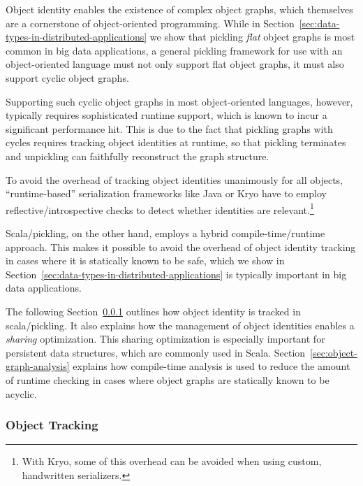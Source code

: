 \documentclass[preprint,10pt]{sigplanconf}
\theoremstyle{definition}
\theoremstyle{definition}
\begin{document}
Object identity enables the existence of complex object graphs, which
themselves are a cornerstone of object-oriented programming. While in
Section~\ref{sec:data-types-in-distributed-applications} we show that pickling
\textit{flat} object graphs is most common in big data applications, a general
pickling framework for use with an object-oriented language must not only
support flat object graphs, it must also support cyclic object graphs.

Supporting such cyclic object graphs in most object-oriented languages,
however, typically requires sophisticated runtime support, which is known to
incur a significant performance hit. This is due to the fact that pickling
graphs with cycles requires tracking object identities at runtime, so that
pickling terminates and unpickling can faithfully reconstruct the graph
structure.

To avoid the overhead of tracking object identities unanimously for all
objects, ``runtime-based'' serialization frameworks like Java or Kryo have to
employ reflective/introspective checks to detect whether identities are
relevant.\footnote{With Kryo, some of this overhead can be avoided when using custom, handwritten serializers.}

Scala/pickling, on the other hand, employs a hybrid compile-time/runtime
approach. This makes it possible to avoid the overhead of object identity
tracking in cases where it is statically known to be safe, which we show in
Section~\ref{sec:data-types-in-distributed-applications} is typically
important in big data applications.

The following Section~\ref{sec:object-tracking} outlines how object identity
is tracked in scala/pickling. It also explains how the management of object
identities enables a {\em sharing} optimization. This sharing optimization is
especially important for persistent data structures, which are commonly used
in Scala. Section~\ref{sec:object-graph-analysis} explains how compile-time
analysis is used to reduce the amount of runtime checking in cases where
object graphs are statically known to be acyclic.

\subsubsection{Object Tracking}
\label{sec:object-tracking}
\end{document}
